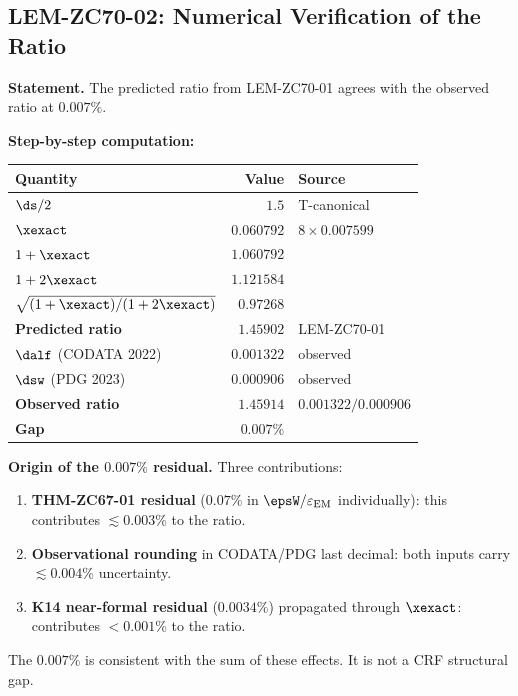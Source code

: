 \documentclass[12pt, a4paper]{article}
\renewcommand{\epsEM}{\varepsilon_{\rm EM}}
\begin{document}
\subsection{LEM-ZC70-02: Numerical Verification of the Ratio}
\label{sec:lem02}


\begin{derivedbox}[title={LEM-ZC70-02: Ratio Numerical Verification ---
  Gap $0.007\%$ ($R_0/R_{\max}$, Near-Formal)}]

\textbf{Statement.}
The predicted ratio from LEM-ZC70-01 agrees with
the observed ratio at $0.007\%$.

\textbf{Step-by-step computation:}
\begin{center}
\renewcommand{\arraystretch}{1.25}
\begin{tabular}{@{}lrl@{}}
\toprule
Quantity & Value & Source \\
\midrule
$\ds/2$ & $1.5$ & T-canonical \\
$\xexact$ & $0.060792$ & $8\times0.007599$ \\
$1 + \xexact$ & $1.060792$ & \\
$1 + 2\xexact$ & $1.121584$ & \\
$\sqrt{(1+\xexact)/(1+2\xexact)}$ & $0.97268$ & \\
\textbf{Predicted ratio} & $\mathbf{1.45902}$ & LEM-ZC70-01 \\
\midrule
$\dalf$ (CODATA 2022) & $0.001322$ & observed \\
$\dsw$ (PDG 2023) & $0.000906$ & observed \\
\textbf{Observed ratio} & $\mathbf{1.45914}$ & $0.001322/0.000906$ \\
\midrule
\textbf{Gap} & $\mathbf{0.007\%}$ & \\
\bottomrule
\end{tabular}
\end{center}

\textbf{Origin of the $0.007\%$ residual.}
Three contributions:
\begin{enumerate}[leftmargin=2em, noitemsep]
  \item \textbf{THM-ZC67-01 residual} ($0.07\%$ in $\epsW/\epsEM$
    individually): this contributes $\lesssim 0.003\%$ to the ratio.
  \item \textbf{Observational rounding} in CODATA/PDG last decimal:
    both inputs carry $\lesssim 0.004\%$ uncertainty.
  \item \textbf{K14 near-formal residual} ($0.0034\%$) propagated
    through $\xexact$: contributes $<0.001\%$ to the ratio.
\end{enumerate}
The $0.007\%$ is consistent with the sum of these effects.
It is not a CRF structural gap.


\end{derivedbox}
\end{document}
